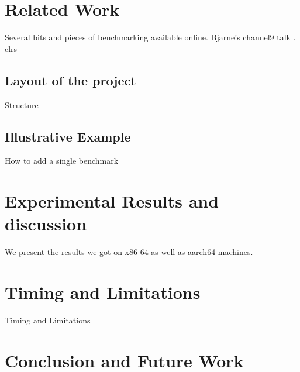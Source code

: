 \documentclass{sig-alternate}
\begin{document}
\section{Related Work}
Several bits and pieces of benchmarking available online.
Bjarne's channel9 talk \cite{stroustrup2012}.
clrs \cite{clrs}

\newpage

\subsection{Layout of the project}
Structure

\subsection{Illustrative Example} \label{subsec:example}
How to add a single benchmark \cite{googlebench}
\newpage

\section{Experimental Results and discussion}
We present the results we got on x86-64 as well as aarch64 machines.

\section{Timing and Limitations}
Timing and Limitations

\section{Conclusion and Future Work}


{\small

}
\end{document}
